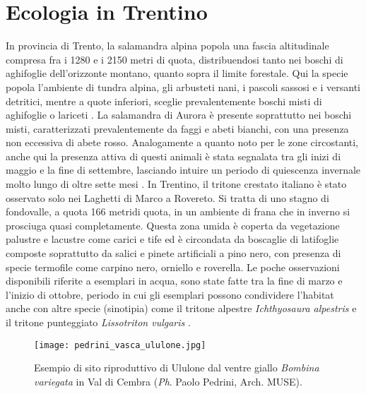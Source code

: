 \documentclass[10pt,twoside,openany,x11names,svgnames,italian,a5paper,dvipsnames,table]{memoir}
\newcommand{\ph}{\emph{Ph}. }
\begin{document}
\section{Ecologia in Trentino}
In provincia di Trento, la salamandra alpina popola una fascia altitudinale compresa fra i 1280 e i 2150 metri di quota, distribuendosi tanto nei boschi di aghifoglie dell'orizzonte montano, quanto sopra il limite forestale. Qui la specie popola l’ambiente di tundra alpina, gli arbusteti nani, i pascoli sassosi e i versanti detritici, mentre a quote inferiori, sceglie prevalentemente boschi misti di aghifoglie o lariceti \cite{Caldonazzi02}. 
La salamandra di Aurora è presente soprattutto nei boschi misti, caratterizzati prevalentemente da faggi e abeti bianchi, con una presenza non eccessiva di abete rosso. Analogamente a quanto noto per le zone circostanti, anche qui la presenza attiva di questi animali è stata segnalata tra gli inizi di maggio e la fine di settembre, lasciando intuire un periodo di quiescenza invernale molto lungo di oltre sette mesi \cite{Bonato03}. In Trentino, il tritone crestato italiano è stato osservato solo nei Laghetti di Marco a Rovereto. Si tratta di uno stagno di fondovalle, a quota 166 metridi quota, in un ambiente di frana che in inverno si prosciuga quasi completamente. Questa zona umida è coperta da vegetazione palustre e lacustre come carici e tife ed è circondata da boscaglie di latifoglie composte soprattutto da salici e pinete artificiali a pino nero, con presenza di specie termofile come carpino nero, orniello e roverella. Le poche osservazioni disponibili riferite a esemplari in acqua, sono state fatte tra la fine di marzo e l'inizio di ottobre, periodo in cui gli esemplari possono condividere l’habitat anche con altre specie (sinotipia) come il tritone alpestre \emph{Ichthyosaura alpestris} e il tritone punteggiato \emph{Lissotriton vulgaris} \cite{Caldonazzi02}. 
\begin{wrapfigure}{l}{.55\columnwidth}
\centering
  \texttt{[image: pedrini\_vasca\_ululone.jpg]}
  \caption*{Esempio di sito riproduttivo di Ululone dal ventre giallo \emph{Bombina variegata} in Val di Cembra (\ph Paolo Pedrini, Arch. MUSE).}
\end{wrapfigure}
\end{document}
